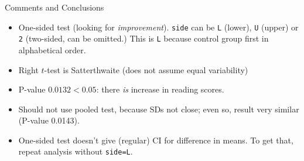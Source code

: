 \documentclass[unknownkeysallowed]{beamer}\usepackage[]{graphicx}\usepackage[]{color}
\begin{document}
\begin{frame}{Comments and Conclusions}

  \begin{itemize}
  \item One-sided test (looking for \emph{improvement}). \texttt{side}
    can be \texttt{L} (lower), \texttt{U} (upper) or \texttt{2}
    (two-sided, can be omitted.) This is \texttt{L} because control
    group first in alphabetical order.
  \item Right $t$-test is Satterthwaite (does not assume equal variability)
  \item P-value $0.0132<0.05$: there \emph{is} increase in reading scores.
  \item Should not use pooled test, because SDs not close; even so,
    result very similar (P-value 0.0143).
  \item One-sided test doesn't give (regular) CI for difference in
    means. To get that, repeat analysis without \texttt{side=L}.
  \end{itemize}
  
\end{frame}
\end{document}
